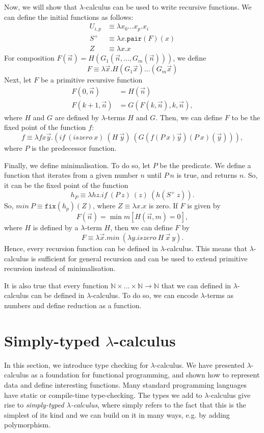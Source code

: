 \documentclass[a4paper, openany]{memoir}
\theoremstyle{definition}
\begin{document}
    Now, we will show that $\lambda$-calculus can be used to write recursive functions. We can define the initial functions as follows:
    \begin{align*}
        U_{i, p} &\equiv \lambda x_0 \dots x_p. x_i \\
        S^+ &\equiv \lambda x.\texttt{pair}(F)(x) \\
        Z &\equiv \lambda x.x
    \end{align*}
    For composition $F(\vec{n}) = H(G_1(\vec{n}, \dots, G_m(\vec{n})))$, we define
    \[F \equiv \lambda \vec{x}.H(G_1\vec{x}) \dots (G_m \vec{x})\]
    Next, let $F$ be a primitive recursive function
    \begin{align*}
        F(0, \vec{n}) &= H(\vec{n}) \\
        F(k+1, \vec{n}) &= G(F(k, \vec{n}), k, \vec{n}),
    \end{align*}
    where $H$ and $G$ are defined by $\lambda$-terms $H$ and $G$. Then, we can define $F$ to be the fixed point of the function $f$:
    \[f \equiv \lambda f x \vec{y}. (\textit{if} \ (\textit{iszero} \ x) \ (H \ \vec{y}) \ (G(f(P\ x) \vec{y}) (P \ x)(\vec{y}))),\]
    where $P$ is the predecessor function.

    Finally, we define minimalisation. To do so, let $P$ be the predicate. We define a function that iterates from a given number $n$ until $P \ n$ is true, and returns $n$. So, it can be the fixed point of the function
    \[h_P \equiv \lambda hz.\textit{if} \ (P \ z) \ (z) \ (h(S^+ \ z)).\]
    So, $\textit{min} \ P \equiv \texttt{fix}(h_p)(Z)$, where $Z \equiv \lambda x.x$ is zero. If $F$ is given by
    \[F(\vec{n}) = \min m[H(\vec{n}, m) = 0],\]
    where $H$ is defined by a $\lambda$-term $H$, then we can define $F$ by
    \[F \equiv \lambda \vec{x}.\textit{min} \ (\lambda y.\textit{iszero} \ H \ \vec{x} \ y).\]
    Hence, every recursion function can be defined in $\lambda$-calculus. This means that $\lambda$-calculus is sufficient for general recursion and can be used to extend primitive recursion instead of minimalisation.

    It is also true that every function $\mathbb{N} \times \dots \times \mathbb{N} \to \mathbb{N}$ that we can defined in $\lambda$-calculus can be defined in $\lambda$-calculus. To do so, we can encode $\lambda$-terms as numbers and define reduction as a function.
    \newpage

    \section{Simply-typed $\lambda$-calculus}
    In this section, we introduce type checking for $\lambda$-calculus. We have presented $\lambda$-calculus as a foundation for functional programming, and shown how to represent data and define interesting functions. Many standard programming languages have static or compile-time type-checking. The types we add to $\lambda$-calculus give rise to \emph{simply-typed $\lambda$-calculus}, where simply refers to the fact that this is the simplest of its kind and we can build on it in many ways, e.g. by adding polymorphism.
\end{document}
